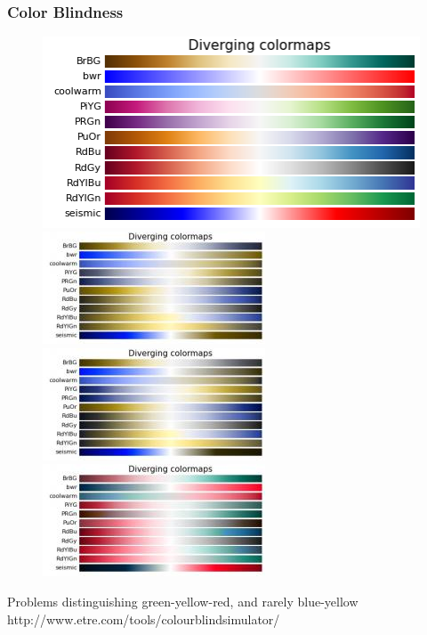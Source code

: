 \documentclass[ignorenonframetext]{beamer}
\begin{document}
\begin{frame}[t]\frametitle{Color Blindness}
	\begin{figure}
		\centering
		\includegraphics[width=.45\textwidth]{figures/colormaps_diverging}
		\includegraphics[width=.45\textwidth]{figures/colormaps_diverging_deuteranopia}\\
		\includegraphics[width=.45\textwidth]{figures/colormaps_diverging_protanopia}
		\includegraphics[width=.45\textwidth]{figures/colormaps_diverging_tritanopia}
	\end{figure}
	Problems distinguishing green-yellow-red, and rarely blue-yellow
	\tiny{http://www.etre.com/tools/colourblindsimulator/}
\end{frame}
\end{document}

